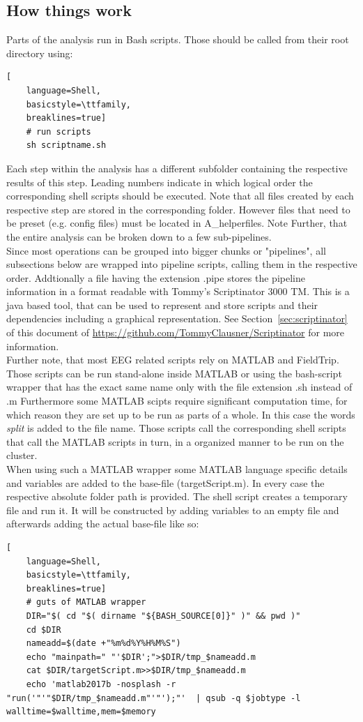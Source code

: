 \documentclass[12pt,a4paper]{scrartcl}
\begin{document}
\subsection{How things work}
Parts of the analysis run in Bash scripts. Those should be called from their root directory using:
\begin{lstlisting}[
    language=Shell,
    basicstyle=\ttfamily,
    breaklines=true]
    # run scripts
    sh scriptname.sh
\end{lstlisting}
Each step within the analysis has a different subfolder containing the respective results of this step. Leading numbers indicate in which logical order the corresponding shell scripts should be executed. Note that all files created by each respective step are stored in the corresponding folder. However files that need to be preset (e.g. config files) must be located in A\_helperfiles. Note Further, that the entire analysis can be broken down to a few sub-pipelines.\\

\noindent Since most operations can be grouped into bigger chunks or "pipelines", all subsections below are wrapped into pipeline scripts, calling them in the respective order. Addtionally a file having the extension .pipe stores the pipeline information in a format readable with Tommy's Scriptinator 3000 TM. This is a java based tool, that can be used to represent and store scripts and their dependencies including a graphical representation. See Section~\ref{sec:scriptinator} of this document of \href{https://github.com/TommyClausner/Scriptinator}{https://github.com/TommyClausner/Scriptinator} for more information.\\

\noindent Further note, that most EEG related scripts rely on MATLAB and FieldTrip. Those scripts can be run stand-alone inside MATLAB or using the bash-script wrapper that has the exact same name only with the file extension .sh instead of .m Furthermore some MATLAB scipts require significant computation time, for which reason they are set up to be run as parts of a whole. In this case the words \textit{split} is added to the file name. Those scripts call the corresponding shell scripts that call the MATLAB scripts in turn, in a organized manner to be run on the cluster.\\

\noindent When using such a MATLAB wrapper some MATLAB language specific details and variables are added to the base-file (targetScript.m). In every case the respective absolute folder path is provided. The shell script creates a temporary file and run it. It will be constructed by adding variables to an empty file and afterwards adding the actual base-file like so:
\begin{lstlisting}[
    language=Shell,
    basicstyle=\ttfamily,
    breaklines=true]
    # guts of MATLAB wrapper
    DIR="$( cd "$( dirname "${BASH_SOURCE[0]}" )" && pwd )"
    cd $DIR
    nameadd=$(date +"%m%d%Y%H%M%S")
    echo "mainpath=" "'$DIR';">$DIR/tmp_$nameadd.m
    cat $DIR/targetScript.m>>$DIR/tmp_$nameadd.m
    echo 'matlab2017b -nosplash -r "run('"'"$DIR/tmp_$nameadd.m"'"');"'  | qsub -q $jobtype -l walltime=$walltime,mem=$memory
\end{lstlisting}
\end{document}

